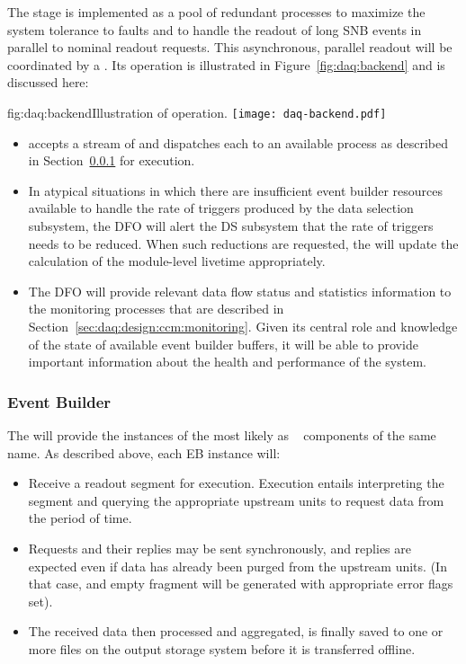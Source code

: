 The  stage is implemented as a pool of redundant  processes to maximize the system tolerance to faults and to handle the readout of long SNB events in parallel to nominal readout requests. This asynchronous, parallel readout will be coordinated by a .  Its operation is illustrated in Figure~\ref{fig:daq:backend} and is discussed here:


\begin{dunefigure}{fig:daq:backend}{Illustration of   operation.}
  \texttt{[image: daq-backend.pdf]}
\end{dunefigure}

\begin{itemize}
\item {} accepts a stream of  and dispatches each to an available  process as described in Section~\ref{sec:daq:design-event-builder} for execution.
\item In atypical situations in which there are insufficient event builder resources available to handle the rate of triggers produced by the data selection subsystem, the DFO will alert the DS subsystem that the rate of triggers needs to be reduced.  When such reductions are requested, the  will update the calculation of the module-level  livetime appropriately.
\item The DFO will provide relevant data flow status and statistics information to the monitoring processes that are described in Section~\ref{sec:daq:design:ccm:monitoring}. Given its central role and knowledge of the state of available event builder buffers, it will be able to provide important information about the health and performance of the system.
\end{itemize}

\subsubsection{Event Builder}
\label{sec:daq:design-event-builder}

The  will provide the instances of the  most likely as
~\cite{artdaq} components of the same name. 
As described above, each EB instance will:

\begin{itemize}
  \item Receive a readout segment for execution. Execution entails interpreting the  segment and querying the appropriate upstream  units to request data from the period of time. 
  \item Requests and their replies may be sent synchronously, and replies are expected even if data has already been purged from the upstream  units. (In that case, and empty fragment will be generated with appropriate error flags set).
  \item The received data then processed and aggregated, is finally saved to one or more files on the output storage system before it is transferred offline.
\end{itemize}

